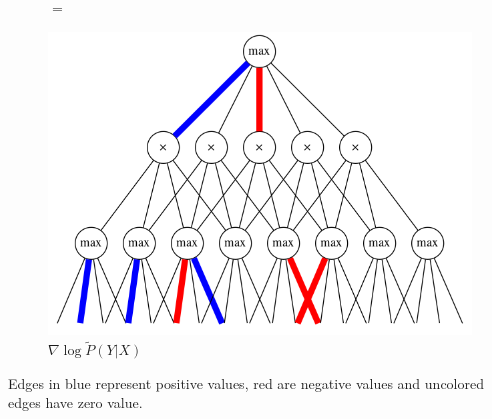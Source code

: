 \documentclass{beamer}
\newcommand{\ddspn}[2]{\frac{\partial#1}{\partial#2}}
\begin{document}
\begin{frame}
\begin{figure}[h]
\begin{minipage}{0.3\textwidth}
      \caption*{$\ddspn{}{W}\log M(X)$}
    \end{minipage}
    $=$
    \begin{minipage}{0.3\textwidth}
      \includegraphics[width=\linewidth]{imgs/hard_diff_2.png}
      \captionsetup{justification=centering}
      \caption*{$\nabla\log\tilde{P}(Y|X)$}
    \end{minipage}
  \end{figure}

  Edges in blue represent positive values, red are negative values and uncolored edges have zero
  value.
\end{frame}
\end{document}
